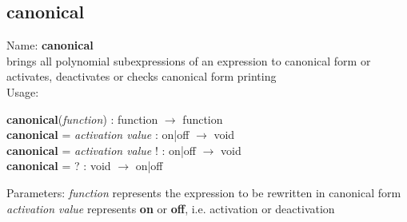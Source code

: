 \subsection{ canonical }
\noindent Name: \textbf{canonical}\\
brings all polynomial subexpressions of an expression to canonical form or activates, deactivates or checks canonical form printing\\

\noindent Usage: 
\begin{center}
\textbf{canonical}(\emph{function}) : \textsf{function} $\rightarrow$ \textsf{function}\\
\textbf{canonical} = \emph{activation value} : \textsf{on|off} $\rightarrow$ \textsf{void}\\
\textbf{canonical} = \emph{activation value} ! : \textsf{on|off} $\rightarrow$ \textsf{void}\\
\textbf{canonical} = ? : \textsf{void} $\rightarrow$ \textsf{on|off}\\
\end{center}
Parameters: 
\emph{function} represents the expression to be rewritten in canonical form\\
\emph{activation value} represents \textbf{on} or \textbf{off}, i.e. activation or deactivation\\

